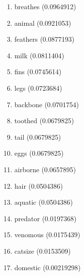 \begin{enumerate}
\item breathes (0.0964912)
\item animal (0.0921053)
\item feathers (0.0877193)
\item milk (0.0811404)
\item fins (0.0745614)
\item legs (0.0723684)
\item backbone (0.0701754)
\item toothed (0.0679825)
\item tail (0.0679825)
\item eggs (0.0679825)
\item airborne (0.0657895)
\item hair (0.0504386)
\item aquatic (0.0504386)
\item predator (0.0197368)
\item venomous (0.0175439)
\item catsize (0.0153509)
\item domestic (0.00219298)
\end{enumerate}